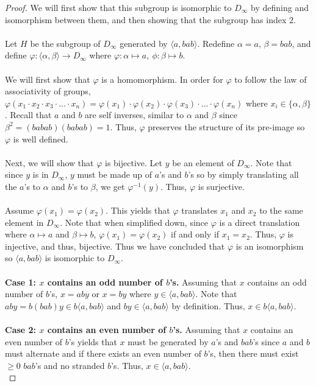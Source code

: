 \documentclass{article}
\theoremstyle{definition}
\begin{document}
\begin{proof}
    We will first show that this subgroup is isomorphic to $D_{\infty}$ by defining and isomorphism between them, and then showing that the subgroup has index 2.\\
    \\
    Let $H$ be the subgroup of $D_\infty$ generated by $\langle a,bab \rangle$. Redefine $\alpha = a$, $\beta = bab$, and define $\varphi: \langle \alpha,\beta\rangle \rightarrow D_{\infty}$ where $\varphi:\alpha \mapsto a,\ \phi:\beta \mapsto b$.\\
    \\
    We will first show that $\varphi$ is a homomorphism. In order for $\varphi$ to follow the law of associativity of groups, $\varphi(x_1 \cdot x_2 \cdot x_3 \cdot ... \cdot x_n) = \varphi(x_1) \cdot \varphi(x_2) \cdot \varphi(x_3) \cdot ... \cdot \varphi(x_n)$ where $x_i \in \{\alpha, \beta\}$. Recall that $a$ and $b$ are self inverses, similar to $\alpha$ and $\beta$ since $\beta^2=(babab)(babab)=1$. Thus, $\varphi$ preserves the structure of its pre-image so $\varphi$ is well defined.\\
    \\
    Next, we will show that $\varphi$ is bijective. Let $y$ be an element of $D_\infty$. Note that since $y$ is in $D_\infty$, $y$ must be made up of $a$'s and $b$'s so by simply translating all the $a$'s to $\alpha$ and $b$'s to $\beta$, we get $\varphi^{-1}(y)$. Thus, $\varphi$ is surjective.  \\
\\
   Assume $\varphi(x_1)=\varphi(x_2)$. This yields that $\varphi$ translates $x_1$ and $x_2$ to the same element in $D_\infty$. Note that when simplified down, since $\varphi$ is a direct translation where $\alpha\mapsto a$ and $\beta\mapsto b$, $\varphi(x_1)=\varphi(x_2)$ if and only if $x_1=x_2$. Thus, $\varphi$ is injective, and thus, bijective. Thus we have concluded that $\varphi$ is an isomorphism so $\langle a,bab\rangle$ is isomorphic to $D_\infty$.\\
\\
    \textbf{Case 1: $x$ contains an odd number of $b$'s.} Assuming that $x$ contains an odd number of $b$'s, $x=aby$ or $x=by$ where $y\in\langle a,bab\rangle$. Note that $aby=b(bab)y\in b\langle a,bab\rangle$ and $by\in \langle a,bab\rangle$ by definition. Thus, $x\in b\langle a,bab\rangle$. \\
    \\
    \textbf{Case 2: $x$ contains an even number of $b$'s.} Assuming that $x$ contains an even number of $b$'s yields that $x$ must be generated by $a$'s and $bab$'s since $a$ and $b$ must alternate and if there exists an even number of $b$'s, then there must exist $\geq 0$ $bab$'s and no stranded $b$'s. Thus, $x\in \langle a,bab\rangle$.\\

\end{proof}
\end{document}
